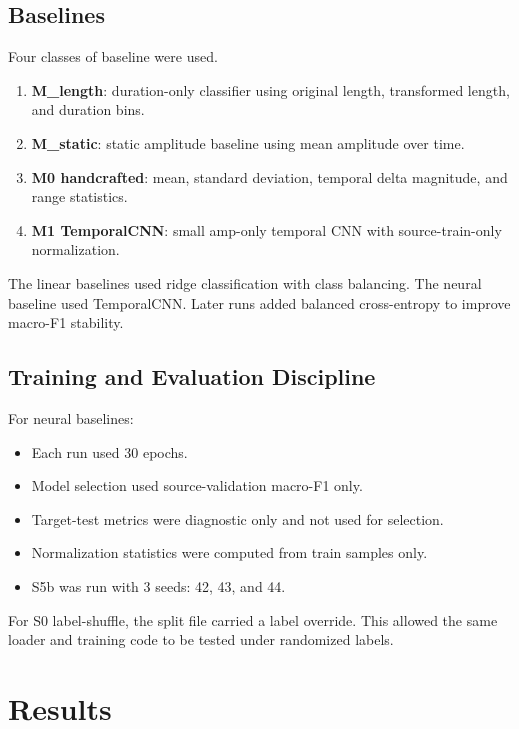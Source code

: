 \documentclass[11pt]{article}
\begin{document}
\subsection{Baselines}

Four classes of baseline were used.

\begin{enumerate}
  \item \textbf{M\_length}: duration-only classifier using original length, transformed length, and duration bins.
  \item \textbf{M\_static}: static amplitude baseline using mean amplitude over time.
  \item \textbf{M0 handcrafted}: mean, standard deviation, temporal delta magnitude, and range statistics.
  \item \textbf{M1 TemporalCNN}: small amp-only temporal CNN with source-train-only normalization.
\end{enumerate}

The linear baselines used ridge classification with class balancing. The neural baseline used TemporalCNN. Later runs added balanced cross-entropy to improve macro-F1 stability.

\subsection{Training and Evaluation Discipline}

For neural baselines:

\begin{itemize}
  \item Each run used 30 epochs.
  \item Model selection used source-validation macro-F1 only.
  \item Target-test metrics were diagnostic only and not used for selection.
  \item Normalization statistics were computed from train samples only.
  \item S5b was run with 3 seeds: 42, 43, and 44.
\end{itemize}

For S0 label-shuffle, the split file carried a label override. This allowed the same loader and training code to be tested under randomized labels.

\section{Results}
\end{document}

